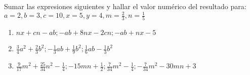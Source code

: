 \begin{frame}

Sumar las expresiones siguientes y hallar el valor numérico del resultado para:
$a = 2, b=3, c=10, x=5, y=4, m=\frac{2}{3}, n=\frac{1}{5}$

\begin{enumerate}
\item $nx+cn-ab; -ab+8nx-2cn; -ab+nx-5$
\item $\frac{3}{4}a^2 + \frac{2}{3}b^2; -\frac{1}{3}ab + \frac{1}{9}b^2; \frac{1}{6}ab - \frac{1}{3} b^2$
\item $\frac{9}{17} m^2 + \frac{25}{34}n^2 - \frac{1}{4}; -15mn + \frac{1}{2}; \frac{7}{34}m^2 - \frac{1}{4}; -\frac{7}{34}m^2 - 30mn+3$
\end{enumerate}

\end{frame}


